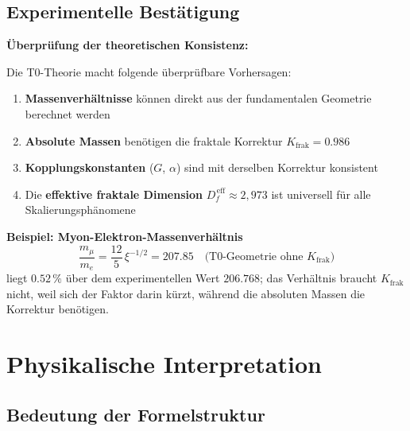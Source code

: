 	\subsection{Experimentelle Bestätigung}
	
	\begin{verification}
		\textbf{Überprüfung der theoretischen Konsistenz:}
		
		Die T0-Theorie macht folgende überprüfbare Vorhersagen:
		
		\begin{enumerate}
			\item \textbf{Massenverhältnisse} können direkt aus der fundamentalen Geometrie berechnet werden
			\item \textbf{Absolute Massen} benötigen die fraktale Korrektur $K_{\text{frak}} = 0.986$
			\item \textbf{Kopplungskonstanten} ($G$, $\alpha$) sind mit derselben Korrektur konsistent
			\item Die \textbf{effektive fraktale Dimension} $D_f^{\,\text{eff}} \approx 2{,}973$ ist universell für alle Skalierungsphänomene
		\end{enumerate}
		
		\textbf{Beispiel: Myon-Elektron-Massenverhältnis}
		\begin{equation}
			\frac{m_\mu}{m_e} = \frac{12}{5}\,\xi^{-1/2} = 207.85 \quad \text{(T0-Geometrie ohne $K_{\text{frak}}$)}
		\end{equation}
		liegt $0.52\,\%$ über dem experimentellen Wert $206.768$; das Verhältnis braucht $K_{\text{frak}}$ nicht, weil sich der Faktor darin kürzt, während die absoluten Massen die Korrektur benötigen.
	\end{verification}
	
	\section{Physikalische Interpretation}
	
	\subsection{Bedeutung der Formelstruktur}
	
